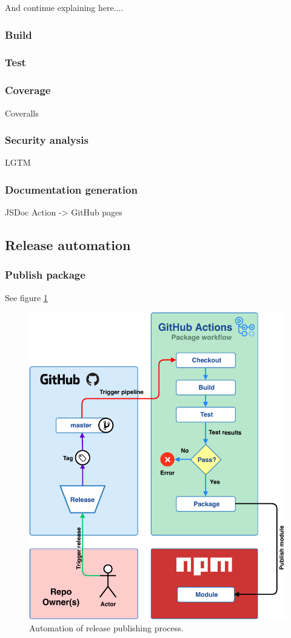And continue explaining here....
\subsubsection{Build}
\subsubsection{Test}
\subsubsection{Coverage}
Coveralls
\subsubsection{Security analysis}
LGTM
\subsubsection{Documentation generation}
JSDoc Action -> GitHub pages

\subsection{Release automation}

\subsubsection{Publish package}
See figure \ref{fig:release-automation}
\begin{figure}[h]
    \setlength{\abovecaptionskip}{25pt}
    \centering
    \includegraphics[page=1,scale=1]{sections/methodology/figures/package-release-automation.pdf}
    \caption{Automation of release publishing process.}
    \label{fig:release-automation}
\end{figure}

